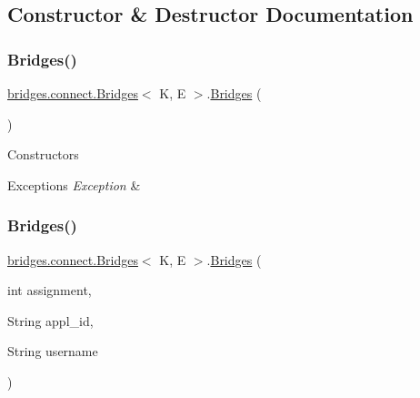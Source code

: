\subsection{Constructor \& Destructor Documentation}
\hypertarget{classbridges_1_1connect_1_1_bridges_a4925cf146eff9ff84e89351ab574795d}{}\label{classbridges_1_1connect_1_1_bridges_a4925cf146eff9ff84e89351ab574795d} 
\subsubsection{\texorpdfstring{Bridges()}{Bridges()}\hspace{0.1cm}{\footnotesize\ttfamily [1/2]}}
{\footnotesize\ttfamily \hyperlink{classbridges_1_1connect_1_1_bridges}{bridges.\+connect.\+Bridges}$<$ K, E $>$.\hyperlink{classbridges_1_1connect_1_1_bridges}{Bridges} (\begin{DoxyParamCaption}{ }\end{DoxyParamCaption})}

Constructors 
\begin{DoxyExceptions}{Exceptions}
{\em Exception} & \\
\hline
\end{DoxyExceptions}
\hypertarget{classbridges_1_1connect_1_1_bridges_a297e7ca95c725fa20bce0768c2d9aa64}{}\label{classbridges_1_1connect_1_1_bridges_a297e7ca95c725fa20bce0768c2d9aa64} 
\subsubsection{\texorpdfstring{Bridges()}{Bridges()}\hspace{0.1cm}{\footnotesize\ttfamily [2/2]}}
{\footnotesize\ttfamily \hyperlink{classbridges_1_1connect_1_1_bridges}{bridges.\+connect.\+Bridges}$<$ K, E $>$.\hyperlink{classbridges_1_1connect_1_1_bridges}{Bridges} (\begin{DoxyParamCaption}\item[{int}]{assignment,  }\item[{String}]{appl\+\_\+id,  }\item[{String}]{username }\end{DoxyParamCaption})}


